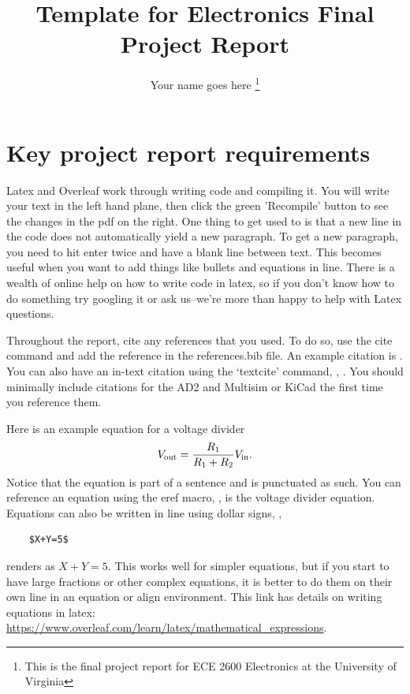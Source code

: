 \documentclass[journal]{IEEEtran} %
\begin{document}
\title{Template for Electronics Final Project Report}


\author{Your name goes here%
\thanks{This is the final project report for ECE 2600 Electronics at the University of Virginia}}


\maketitle

\section{Key project report requirements}


Latex and Overleaf work through writing code and compiling it.  
You will write your text in the left hand plane, then click the green 'Recompile' button to see the changes in the pdf on the right.  
One thing to get used to is that a new line in the code does not automatically yield a new paragraph.  
To get a new paragraph, you need to hit enter twice and have a blank line between text. 
This becomes useful when you want to add things like bullets and equations in line.
There is a wealth of online help on how to write code in latex, so if you don't know how to do something try googling it or ask us--we're more than happy to help with Latex questions. 


Throughout the report, cite any references that you used. 
To do so, use the cite command and add the reference in the references.bib file. 
An example citation is \cite{tle2426}.
You can also have an in-text citation using the `textcite' command, \eg, \textcite{fung:2022:jfbjacobianfreebackpropagation}.
You should minimally include citations for the AD2 \cite{AD2} and Multisim \cite{Multisim} or KiCad \cite{KiCad} the first time you reference them. 

Here is an example equation for a voltage divider
\begin{equation}
    V_\text{out} = \frac{R_1}{R_1 + R_2} V_\text{in} 
    \label{eq: resistor divider}
.\end{equation}
Notice that the equation is part of a sentence and is punctuated as such. 
You can reference an equation using the eref macro, \eg,  is the voltage divider equation. 
Equations can also be written in line using dollar signs, \eg, 
\begin{verbatim}
    $X+Y=5$
\end{verbatim}
renders as $X+Y=5$.
This works well for simpler equations, but if you start to have large fractions or other complex equations, it is better to do them on their own line in an equation or align environment. 
This link has details on writing equations in latex: \url{https://www.overleaf.com/learn/latex/mathematical_expressions}. 
\end{document}
